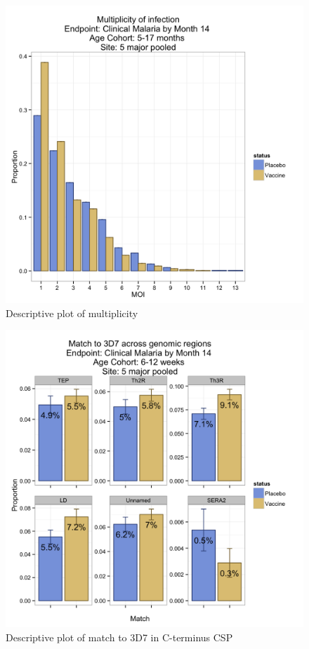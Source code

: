 \documentclass[]{article}
\begin{document}
\begin{figure}[htbp]
\centering
\includegraphics{figures/moi-infant-c-1.png}
\caption{Descriptive plot of multiplicity}
\end{figure}

\begin{figure}[htbp]
\centering
\includegraphics{figures/match-newborn-c-1.png}
\caption{Descriptive plot of match to 3D7 in C-terminus CSP}
\end{figure}
\end{document}
